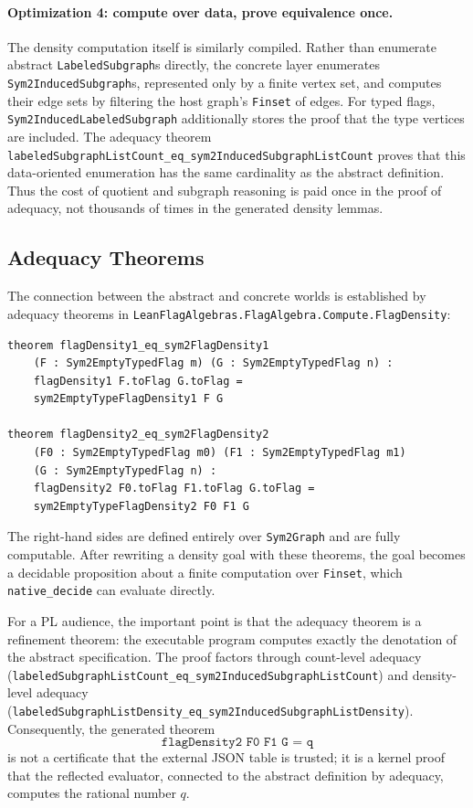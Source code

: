 \documentclass{article}
\newcommand{\lean}[1]{\texttt{#1}}
\begin{document}
\paragraph{Optimization 4: compute over data, prove equivalence once.}
The density computation itself is similarly compiled.  Rather than enumerate
abstract \lean{LabeledSubgraph}s directly, the concrete layer enumerates
\lean{Sym2InducedSubgraph}s, represented only by a finite vertex set, and
computes their edge sets by filtering the host graph's \lean{Finset} of edges.
For typed flags, \lean{Sym2InducedLabeledSubgraph} additionally stores the
proof that the type vertices are included.  The adequacy theorem
\lean{labeledSubgraphListCount\_eq\_sym2InducedSubgraphListCount} proves that
this data-oriented enumeration has the same cardinality as the abstract
definition.  Thus the cost of quotient and subgraph reasoning is paid once in
the proof of adequacy, not thousands of times in the generated density lemmas.

\subsection{Adequacy Theorems}

The connection between the abstract and concrete worlds is established by
adequacy theorems in \lean{LeanFlagAlgebras.FlagAlgebra.Compute.FlagDensity}:

\begin{lstlisting}
theorem flagDensity1_eq_sym2FlagDensity1
    (F : Sym2EmptyTypedFlag m) (G : Sym2EmptyTypedFlag n) :
    flagDensity1 F.toFlag G.toFlag =
    sym2EmptyTypeFlagDensity1 F G

theorem flagDensity2_eq_sym2FlagDensity2
    (F0 : Sym2EmptyTypedFlag m0) (F1 : Sym2EmptyTypedFlag m1)
    (G : Sym2EmptyTypedFlag n) :
    flagDensity2 F0.toFlag F1.toFlag G.toFlag =
    sym2EmptyTypeFlagDensity2 F0 F1 G
\end{lstlisting}
The right-hand sides are defined entirely over \lean{Sym2Graph}
and are fully computable.  After rewriting a density goal with these theorems,
the goal becomes a decidable proposition about a finite computation over
\lean{Finset}, which \lean{native\_decide} can evaluate directly.

For a PL audience, the important point is that the adequacy theorem is a
refinement theorem: the executable program computes exactly the denotation of
the abstract specification.  The proof factors through count-level adequacy
(\lean{labeledSubgraphListCount\_eq\_sym2InducedSubgraphListCount}) and
density-level adequacy
(\lean{labeledSubgraphListDensity\_eq\_sym2InducedSubgraphListDensity}).
Consequently, the generated theorem
\[
  \lean{flagDensity2 F0 F1 G = q}
\]
is not a certificate that the external JSON table is trusted; it is a kernel
proof that the reflected evaluator, connected to the abstract definition by
adequacy, computes the rational number $q$.
\end{document}
